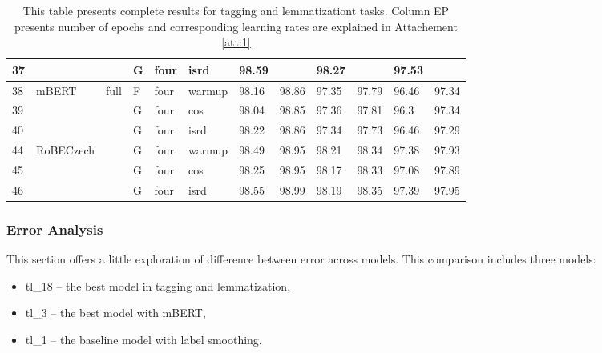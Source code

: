 \begin{table}[!h]
{\begin{tabular}{|l|l|l|l|l|l||llllll|}
37 &                              &                         & G	& four                     & isrd   & 98.59  &         & 98.27   &          & 97.53     &            \\ \hline
38 & \multirow{3}{*}{mBERT}       & \multirow{9}{*}{full}   & F	& four                     & warmup & 98.16  & 98.86   & 97.35   & 97.79    & 96.46     & 97.34      \\ \cline{1-1} \cline{4-12}
39 &                              &                         & G	& four                     & cos    & 98.04  & 98.85   & 97.36   & 97.81    & 96.3      & 97.34      \\ \cline{1-1} \cline{4-12}
40 &                              &                         & G	& four                     & isrd   & 98.22  & 98.86   & 97.34   & 97.73    & 96.46     & 97.29      \\ \cline{1-2} \cline{4-12}
44 & \multirow{3}{*}{RoBECzech}   &                         & G	& four                     & warmup & 98.49  & 98.95   & 98.21   & 98.34    & 97.38     & 97.93      \\ \cline{1-1} \cline{4-12}
45 &                              &                         & G	& four                     & cos    & 98.25  & 98.95   & 98.17   & 98.33    & 97.08     & 97.89      \\ \cline{1-1} \cline{4-12}
46 &                              &                         & G	& four                     & isrd   & 98.55  & 98.99   & 98.19   & 98.35    & 97.39     & 97.95      \\ \hline

\end{tabular}
}
\caption{This table presents complete results for tagging and lemmatizationt tasks. Column EP presents number of epochs and corresponding learning rates are explained in Attachement \protect\ref{att:1} }
\label{tab:all_res_tl}
\end{table}




\subsubsection{Error Analysis}
This section offers a little exploration of difference between error across models. This comparison includes three models: 
\begin{itemize}
\item tl\_18 -- the best model in tagging and lemmatization,
\item tl\_3 -- the best model with mBERT,
\item tl\_1 -- the baseline model with label smoothing.
\end{itemize} 

